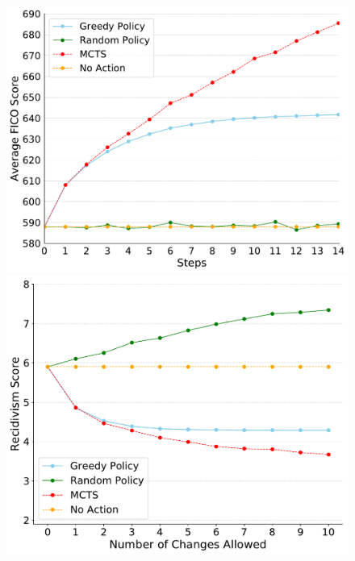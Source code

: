 \begin{figure}
    \centering
{}
    \includegraphics[width=\linewidth]{figures/fixedsimplefico.pdf}
\endminipage\hfill
{}
\includegraphics[width=\linewidth]{figures/compas_yi.pdf}
\endminipage\hfill
{}

\end{figure}
